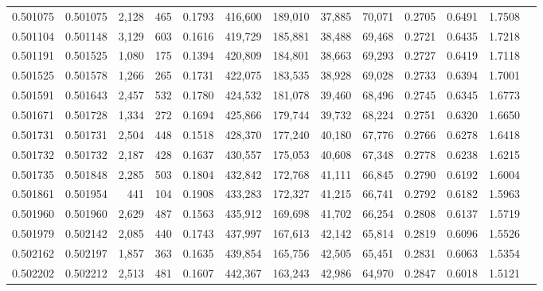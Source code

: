 \begin{tabular}{rrrrrrrrrrrrr}
0.501075 & 0.501075 & 2,128 &   465 &                                     0.1793 & 416,600 & 189,010 &  37,885 &  70,071 & 0.2705 & 0.6491 & 1.7508 \\
0.501104 & 0.501148 & 3,129 &   603 &                                     0.1616 & 419,729 & 185,881 &  38,488 &  69,468 & 0.2721 & 0.6435 & 1.7218 \\
0.501191 & 0.501525 & 1,080 &   175 &                                     0.1394 & 420,809 & 184,801 &  38,663 &  69,293 & 0.2727 & 0.6419 & 1.7118 \\
0.501525 & 0.501578 & 1,266 &   265 &                                     0.1731 & 422,075 & 183,535 &  38,928 &  69,028 & 0.2733 & 0.6394 & 1.7001 \\
0.501591 & 0.501643 & 2,457 &   532 &                                     0.1780 & 424,532 & 181,078 &  39,460 &  68,496 & 0.2745 & 0.6345 & 1.6773 \\
0.501671 & 0.501728 & 1,334 &   272 &                                     0.1694 & 425,866 & 179,744 &  39,732 &  68,224 & 0.2751 & 0.6320 & 1.6650 \\
0.501731 & 0.501731 & 2,504 &   448 &                                     0.1518 & 428,370 & 177,240 &  40,180 &  67,776 & 0.2766 & 0.6278 & 1.6418 \\
0.501732 & 0.501732 & 2,187 &   428 &                                     0.1637 & 430,557 & 175,053 &  40,608 &  67,348 & 0.2778 & 0.6238 & 1.6215 \\
0.501735 & 0.501848 & 2,285 &   503 &                                     0.1804 & 432,842 & 172,768 &  41,111 &  66,845 & 0.2790 & 0.6192 & 1.6004 \\
0.501861 & 0.501954 &   441 &   104 &                                     0.1908 & 433,283 & 172,327 &  41,215 &  66,741 & 0.2792 & 0.6182 & 1.5963 \\
0.501960 & 0.501960 & 2,629 &   487 &                                     0.1563 & 435,912 & 169,698 &  41,702 &  66,254 & 0.2808 & 0.6137 & 1.5719 \\
0.501979 & 0.502142 & 2,085 &   440 &                                     0.1743 & 437,997 & 167,613 &  42,142 &  65,814 & 0.2819 & 0.6096 & 1.5526 \\
0.502162 & 0.502197 & 1,857 &   363 &                                     0.1635 & 439,854 & 165,756 &  42,505 &  65,451 & 0.2831 & 0.6063 & 1.5354 \\
0.502202 & 0.502212 & 2,513 &   481 &                                     0.1607 & 442,367 & 163,243 &  42,986 &  64,970 & 0.2847 & 0.6018 & 1.5121 \\

\end{tabular}
